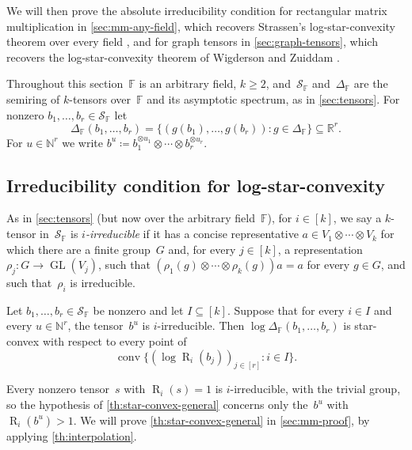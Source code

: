 \documentclass[11pt,letterpaper]{article}
\DeclareMathOperator{\tensorrank}{R}
\newcommand{\FF}{\mathbb{F}}
\newcommand{\RR}{\mathbb{R}}
\newcommand{\NN}{\mathbb{N}}
\DeclareMathOperator{\GL}{GL}
\DeclareMathOperator{\conv}{conv}
\begin{document}
We will then prove the absolute irreducibility condition for rectangular matrix multiplication in \cref{sec:mm-any-field}, which recovers Strassen's log-star-convexity theorem over every field \cite[Theorem~3.10 and Corollary~6.6]{strassen1988asymptotic}, and for graph tensors in \cref{sec:graph-tensors}, which recovers the log-star-convexity theorem of Wigderson and Zuiddam \cite[Theorem~12.23]{wigderson2022asymptotic}.

Throughout this section~$\FF$ is an arbitrary field, $k \geq 2$, and~$\mathcal{S}_\FF$ and~$\Delta_\FF$ are the semiring of $k$-tensors over~$\FF$ and its asymptotic spectrum, as in \cref{sec:tensors}. For nonzero $b_1, \ldots, b_r \in \mathcal{S}_\FF$ let
\[
\Delta_\FF(b_1, \ldots, b_r) = \{ (g(b_1), \ldots, g(b_r)) : g \in \Delta_\FF \} \subseteq \RR^r.
\] For $u \in \NN^r$ we write $b^u \coloneqq b_1^{\otimes u_1} \otimes \cdots \otimes b_r^{\otimes u_r}$. 

\subsection{Irreducibility condition for log-star-convexity}\label{sec:star-convex-statement}

As in \cref{sec:tensors} (but now over the arbitrary field~$\FF$), for $i \in [k]$, we say a $k$-tensor in~$\mathcal{S}_\FF$ is \emph{$i$-irreducible} if it has a concise representative $a \in V_1 \otimes \cdots \otimes V_k$ for which there are a finite group~$G$ and, for every $j \in [k]$, a representation $\rho_j : G \to \GL(V_j)$, such that $(\rho_1(g) \otimes \cdots \otimes \rho_k(g))a = a$ for every $g \in G$, and such that~$\rho_i$ is irreducible.

\begin{theorem}\label{th:star-convex-general}
Let $b_1, \ldots, b_r \in \mathcal{S}_\FF$ be nonzero and let $I \subseteq [k]$. Suppose that for every $i \in I$ and every $u \in \NN^r$, the tensor~$b^u$ is $i$-irreducible. Then $\log \Delta_\FF(b_1, \ldots, b_r)$ is star-convex with respect to every point of
\[
\conv\bigl\{ (\log \tensorrank_i(b_j))_{j \in [r]} : i \in I \bigr\}.
\]
\end{theorem}

Every nonzero tensor~$s$ with $\tensorrank_i(s) = 1$ is $i$-irreducible, with the trivial group, so the hypothesis of \cref{th:star-convex-general} concerns only the~$b^u$ with $\tensorrank_i(b^u) > 1$. We will prove \cref{th:star-convex-general} in \cref{sec:mm-proof}, by applying \cref{th:interpolation}.
\end{document}
